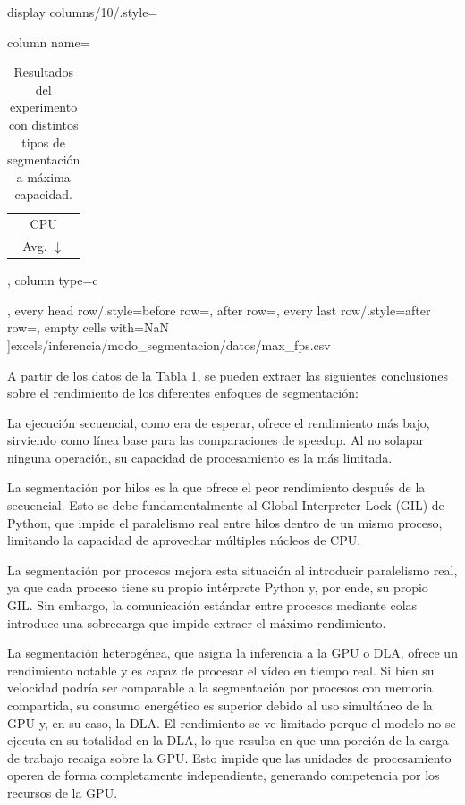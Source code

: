 \documentclass[11pt,spanish,listoffigures,listoftables]{tfgetsinf}
\begin{document}
\begin{table}[H]
{       display columns/10/.style={column name=\begin{tabular}[c]{@{}c@{}}CPU\\Avg. $\downarrow$\end{tabular}, column type={c}},
       every head row/.style={before row=\toprule, after row=\midrule},
       every last row/.style={after row=\bottomrule},
       empty cells with={NaN}
   ]{excels/inferencia/modo_segmentacion/datos/max_fps.csv}
   }
   \caption[Resultados del experimento con distintos tipos de segmentación a máxima capacidad]{Resultados del experimento con distintos tipos de segmentación a máxima capacidad.}
   \label{tab:experimento_segmentacion_max_fps}
\end{table}



A partir de los datos de la Tabla \ref{tab:experimento_segmentacion_max_fps}, se pueden extraer las siguientes conclusiones sobre el rendimiento de los diferentes enfoques de segmentación:

La ejecución secuencial, como era de esperar, ofrece el rendimiento más bajo, sirviendo como línea base para las comparaciones de speedup. Al no solapar ninguna operación, su capacidad de procesamiento es la más limitada.

La segmentación por hilos es la que ofrece el peor rendimiento después de la secuencial. Esto se debe fundamentalmente al Global Interpreter Lock (GIL) de Python, que impide el paralelismo real entre hilos dentro de un mismo proceso, limitando la capacidad de aprovechar múltiples núcleos de CPU.

La segmentación por procesos mejora esta situación al introducir paralelismo real, ya que cada proceso tiene su propio intérprete Python y, por ende, su propio GIL. Sin embargo, la comunicación estándar entre procesos mediante colas introduce una sobrecarga que impide extraer el máximo rendimiento.

La segmentación heterogénea, que asigna la inferencia a la GPU o DLA, ofrece un rendimiento notable y es capaz de procesar el vídeo en tiempo real. Si bien su velocidad podría ser comparable a la segmentación por procesos con memoria compartida, su consumo energético es superior debido al uso simultáneo de la GPU y, en su caso, la DLA. El rendimiento se ve limitado porque el modelo no se ejecuta en su totalidad en la DLA, lo que resulta en que una porción de la carga de trabajo recaiga sobre la GPU. Esto impide que las unidades de procesamiento operen de forma completamente independiente, generando competencia por los recursos de la GPU.
\end{document}
